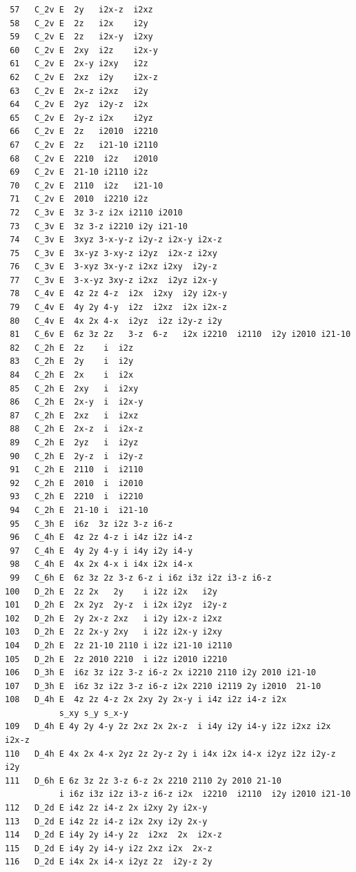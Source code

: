 \documentclass[12pt,a4paper]{article}
\begin{document}
\begin{verbatim}
 57   C_2v E  2y   i2x-z  i2xz    
 58   C_2v E  2z   i2x    i2y     
 59   C_2v E  2z   i2x-y  i2xy    
 60   C_2v E  2xy  i2z    i2x-y   
 61   C_2v E  2x-y i2xy   i2z     
 62   C_2v E  2xz  i2y    i2x-z   
 63   C_2v E  2x-z i2xz   i2y     
 64   C_2v E  2yz  i2y-z  i2x     
 65   C_2v E  2y-z i2x    i2yz    
 66   C_2v E  2z   i2010  i2210   
 67   C_2v E  2z   i21-10 i2110   
 68   C_2v E  2210  i2z   i2010   
 69   C_2v E  21-10 i2110 i2z     
 70   C_2v E  2110  i2z   i21-10  
 71   C_2v E  2010  i2210 i2z     
 72   C_3v E  3z 3-z i2x i2110 i2010 
 73   C_3v E  3z 3-z i2210 i2y i21-10  
 74   C_3v E  3xyz 3-x-y-z i2y-z i2x-y i2x-z 
 75   C_3v E  3x-yz 3-xy-z i2yz  i2x-z i2xy 
 76   C_3v E  3-xyz 3x-y-z i2xz i2xy  i2y-z  
 77   C_3v E  3-x-yz 3xy-z i2xz  i2yz i2x-y  
 78   C_4v E  4z 2z 4-z  i2x  i2xy  i2y i2x-y  
 79   C_4v E  4y 2y 4-y  i2z  i2xz  i2x i2x-z  
 80   C_4v E  4x 2x 4-x  i2yz  i2z i2y-z i2y   
 81   C_6v E  6z 3z 2z   3-z  6-z   i2x i2210  i2110  i2y i2010 i21-10 
 82   C_2h E  2z    i  i2z    
 83   C_2h E  2y    i  i2y    
 84   C_2h E  2x    i  i2x    
 85   C_2h E  2xy   i  i2xy   
 86   C_2h E  2x-y  i  i2x-y  
 87   C_2h E  2xz   i  i2xz   
 88   C_2h E  2x-z  i  i2x-z  
 89   C_2h E  2yz   i  i2yz   
 90   C_2h E  2y-z  i  i2y-z  
 91   C_2h E  2110  i  i2110  
 92   C_2h E  2010  i  i2010  
 93   C_2h E  2210  i  i2210  
 94   C_2h E  21-10 i  i21-10 
 95   C_3h E  i6z  3z i2z 3-z i6-z 
 96   C_4h E  4z 2z 4-z i i4z i2z i4-z 
 97   C_4h E  4y 2y 4-y i i4y i2y i4-y 
 98   C_4h E  4x 2x 4-x i i4x i2x i4-x 
 99   C_6h E  6z 3z 2z 3-z 6-z i i6z i3z i2z i3-z i6-z 
100   D_2h E  2z 2x   2y    i i2z i2x   i2y  
101   D_2h E  2x 2yz  2y-z  i i2x i2yz  i2y-z  
102   D_2h E  2y 2x-z 2xz   i i2y i2x-z i2xz  
103   D_2h E  2z 2x-y 2xy   i i2z i2x-y i2xy  
104   D_2h E  2z 21-10 2110 i i2z i21-10 i2110 
105   D_2h E  2z 2010 2210  i i2z i2010 i2210  
106   D_3h E  i6z 3z i2z 3-z i6-z 2x i2210 2110 i2y 2010 i21-10   
107   D_3h E  i6z 3z i2z 3-z i6-z i2x 2210 i2119 2y i2010  21-10    
108   D_4h E  4z 2z 4-z 2x 2xy 2y 2x-y i i4z i2z i4-z i2x 
           s_xy s_y s_x-y 
109   D_4h E 4y 2y 4-y 2z 2xz 2x 2x-z  i i4y i2y i4-y i2z i2xz i2x i2x-z 
110   D_4h E 4x 2x 4-x 2yz 2z 2y-z 2y i i4x i2x i4-x i2yz i2z i2y-z i2y
111   D_6h E 6z 3z 2z 3-z 6-z 2x 2210 2110 2y 2010 21-10
           i i6z i3z i2z i3-z i6-z i2x  i2210  i2110  i2y i2010 i21-10
112   D_2d E i4z 2z i4-z 2x i2xy 2y i2x-y 
113   D_2d E i4z 2z i4-z i2x 2xy i2y 2x-y 
114   D_2d E i4y 2y i4-y 2z  i2xz  2x  i2x-z  
115   D_2d E i4y 2y i4-y i2z 2xz i2x  2x-z 
116   D_2d E i4x 2x i4-x i2yz 2z  i2y-z 2y 

\end{verbatim}
\end{document}
